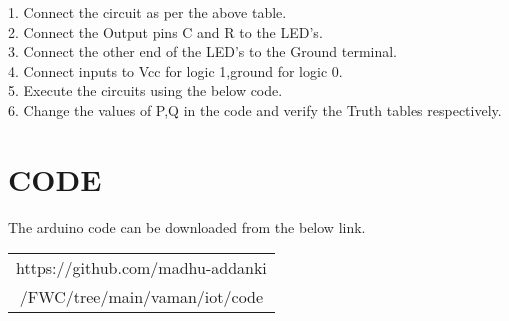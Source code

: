 \documentclass[a4paper,11pt,twocolumn]{article}
\begin{document}
   1. Connect the circuit as per the above table.\\
   2. Connect the Output pins C and R to the LED's.\\
   3. Connect the other end of the LED's to the Ground terminal.\\
   4. Connect inputs to Vcc for logic 1,ground for logic 0.\\
   5. Execute the circuits using the below code.\\
   6. Change the values of P,Q in the code and verify the Truth tables respectively.\\

\section{CODE}
	The arduino code can be downloaded from the below link.
\begin{table}[h]
	\centering
	\begin{tabular}{|c|}
		\hline
                 https://github.com/madhu-addanki\\
            /FWC/tree/main/vaman/iot/code\\
		 \hline
	\end{tabular}
\end{table}
\end{document}
